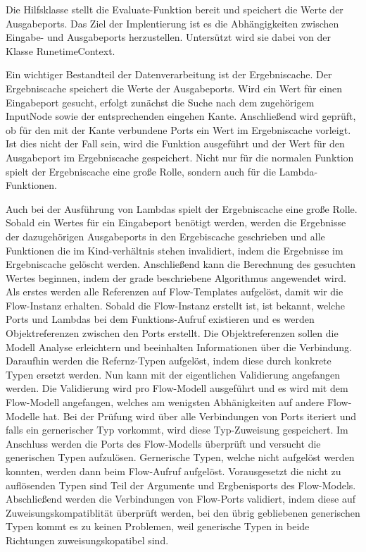 \documentclass{article}
\begin{document}
    Die Hilfsklasse stellt die Evaluate-Funktion bereit und speichert die Werte der Ausgabeports.
    Das Ziel der Implentierung ist es die Abhängigkeiten zwischen Eingabe- und Ausgabeports herzustellen. Untersützt wird sie dabei von der Klasse RunetimeContext.
    
    Ein wichtiger Bestandteil der Datenverarbeitung ist der Ergebniscache. Der Ergebniscache speichert die Werte der Ausgabeports.
    Wird ein Wert für einen Eingabeport gesucht, erfolgt zunächst die Suche nach dem zugehörigem InputNode sowie der entsprechenden eingehen Kante. 
    Anschließend wird geprüft, ob für den mit der Kante verbundene Ports ein Wert im Ergebniscache vorleigt.
    Ist dies nicht der Fall sein, wird die Funktion ausgeführt und der Wert für den Ausgabeport im Ergebniscache gespeichert.
    Nicht nur für die normalen Funktion spielt der Ergebniscache eine große Rolle, sondern auch für die Lambda-Funktionen.
    
    
    Auch bei der Ausführung von Lambdas spielt der Ergebniscache eine große Rolle. Sobald ein Wertes für ein Eingabeport benötigt werden, werden die Ergebnisse der dazugehörigen Ausgabeports in den Ergebiscache geschrieben 
    und alle Funktionen die im Kind-verhältnis stehen invalidiert, indem die Ergebnisse im Ergebniscache gelöscht werden.
    Anschließend kann die Berechnung des gesuchten Wertes beginnen, indem der grade beschriebene Algorithmus angewendet wird.\\

    Als erstes werden alle Referenzen auf Flow-Templates aufgelöst, damit wir die Flow-Instanz erhalten. Sobald die Flow-Instanz erstellt ist, ist bekannt, welche Ports und Lambdas bei dem Funktions-Aufruf existieren und es werden Objektreferenzen zwischen den Ports erstellt.
    Die Objektreferenzen sollen die Modell Analyse erleichtern und beeinhalten Informationen über die Verbindung.
    Daraufhin werden die Refernz-Typen aufgelöst, indem diese durch konkrete Typen ersetzt werden.
    Nun kann mit der eigentlichen Validierung angefangen werden. Die Validierung wird pro Flow-Modell ausgeführt und es wird mit dem Flow-Modell angefangen, welches am wenigsten Abhänigkeiten auf andere Flow-Modelle hat.
    Bei der Prüfung wird über alle Verbindungen von Ports iteriert und falls ein gernerischer Typ vorkommt, wird diese Typ-Zuweisung gespeichert.
    Im Anschluss werden die Ports des Flow-Modells überprüft und versucht die generischen Typen aufzulösen. Gernerische Typen, welche nicht aufgelöst werden konnten, werden dann beim Flow-Aufruf aufgelöst. Vorausgesetzt die nicht zu auflösenden Typen sind Teil der Argumente und Ergbenisports des Flow-Models.
    Abschließend werden die Verbindungen von Flow-Ports validiert, indem diese auf Zuweisungskompatiblität überprüft werden, bei den übrig gebliebenen generischen Typen kommt es zu keinen Problemen, weil generische Typen in beide Richtungen zuweisungskopatibel sind.
\end{document}
